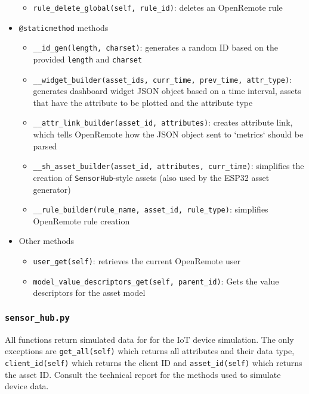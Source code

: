 \begin{appendices}
\begin{itemize}
\begin{itemize}
    \item \lstinline{rule_delete_global(self, rule_id)}: deletes an OpenRemote rule
    \end{itemize}
\item \lstinline{@staticmethod} methods
    \begin{itemize}
    \item \lstinline{__id_gen(length, charset)}: generates a random ID based on the provided \lstinline{length} and \lstinline{charset}
    \item \lstinline{__widget_builder(asset_ids, curr_time, prev_time, attr_type)}: generates dashboard widget JSON object based on a time interval, assets that have the attribute to be plotted and the attribute type
    \item \lstinline{__attr_link_builder(asset_id, attributes)}: creates attribute link, which tells OpenRemote how the JSON object sent to `metrics` should be parsed
    \item \lstinline{__sh_asset_builder(asset_id, attributes, curr_time)}: simplifies the creation of \lstinline{SensorHub}-style assets (also used by the ESP32 asset generator)
    \item \lstinline{__rule_builder(rule_name, asset_id, rule_type)}: simplifies OpenRemote rule creation
    \end{itemize}
\item Other methods
    \begin{itemize}
    \item \lstinline{user_get(self)}: retrieves the current OpenRemote user
    \item \lstinline{model_value_descriptors_get(self, parent_id)}: Gets the value descriptors for the asset model
    \end{itemize}
    \end{itemize}
\subsubsection{\lstinline{sensor_hub.py}}
All functions return simulated data for for the IoT device simulation. The only exceptions are \lstinline{get_all(self)} which returns all attributes and their data type, \lstinline{client_id(self)} which returns the client ID and \lstinline{asset_id(self)} which returns the asset ID. Consult the technical report for the methods used to simulate device data. 


\end{appendices}
